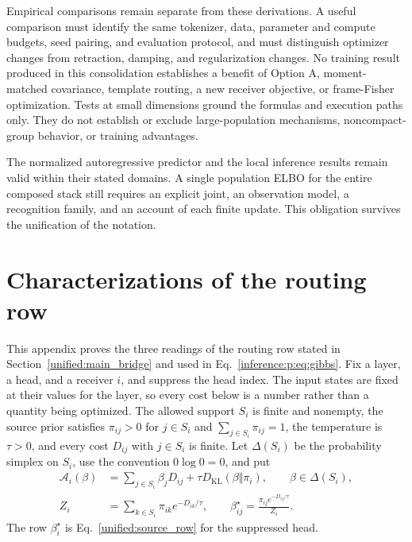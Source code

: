 \documentclass[11pt]{article}
\theoremstyle{definition}
\theoremstyle{remark}
\providecommand{\KL}{D_{\mathrm{KL}}}
\begin{document}
Empirical comparisons remain separate from these derivations. A useful comparison must identify the same tokenizer, data, parameter and compute budgets, seed pairing, and evaluation protocol, and must distinguish optimizer changes from retraction, damping, and regularization changes. No training result produced in this consolidation establishes a benefit of Option A, moment-matched covariance, template routing, a new receiver objective, or frame-Fisher optimization. Tests at small dimensions ground the formulas and execution paths only. They do not establish or exclude large-population mechanisms, noncompact-group behavior, or training advantages.

The normalized autoregressive predictor and the local inference results remain valid within their stated domains. A single population ELBO for the entire composed stack still requires an explicit joint, an observation model, a recognition family, and an account of each finite update. This obligation survives the unification of the notation.
\appendix
\section{Characterizations of the routing row}
\label{unified:row}

This appendix proves the three readings of the routing row stated in Section~\ref{unified:main_bridge} and used in Eq.~\eqref{inference:p:eq:gibbs}. Fix a layer, a head, and a receiver $i$, and suppress the head index. The input states are fixed at their values for the layer, so every cost below is a number rather than a quantity being optimized. The allowed support $S_i$ is finite and nonempty, the source prior satisfies $\pi_{ij}>0$ for $j\in S_i$ and $\sum_{j\in S_i}\pi_{ij}=1$, the temperature is $\tau>0$, and every cost $D_{ij}$ with $j\in S_i$ is finite. Let $\Delta(S_i)$ be the probability simplex on $S_i$, use the convention $0\log0=0$, and put
\begin{equation}
\begin{aligned}
\mathcal A_i(\beta)&=\sum_{j\in S_i}\beta_jD_{ij}+\tau\KL(\beta\Vert\pi_i),\qquad \beta\in\Delta(S_i),\\
Z_i&=\sum_{k\in S_i}\pi_{ik}e^{-D_{ik}/\tau},\qquad \beta_{ij}^\star=\frac{\pi_{ij}e^{-D_{ij}/\tau}}{Z_i}.
\end{aligned}
\label{unified:row:eq:objective}
\end{equation}
The row $\beta_i^\star$ is Eq.~\eqref{unified:source_row} for the suppressed head.
\end{document}
